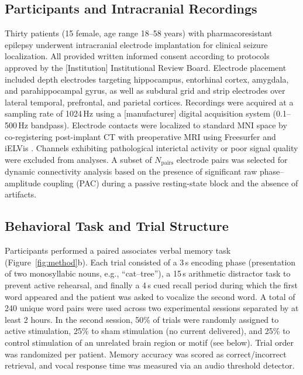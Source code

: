 \documentclass{article}
\begin{document}
\subsection{Participants and Intracranial Recordings}
Thirty patients (15 female, age range 18--58 years) with pharmacoresistant epilepsy underwent intracranial electrode implantation for clinical seizure localization. All provided written informed consent according to protocols approved by the [Institution] Institutional Review Board. Electrode placement included depth electrodes targeting hippocampus, entorhinal cortex, amygdala, and parahippocampal gyrus, as well as subdural grid and strip electrodes over lateral temporal, prefrontal, and parietal cortices. Recordings were acquired at a sampling rate of 1024\,Hz using a [manufacturer] digital acquisition system (0.1--500\,Hz bandpass). Electrode contacts were localized to standard MNI space by co-registering post-implant CT with preoperative MRI using Freesurfer and iELVis \cite{groppe2017ielvis}. Channels exhibiting pathological interictal activity or poor signal quality were excluded from analyses. A subset of \(N_{\text{pairs}}\) electrode pairs was selected for dynamic connectivity analysis based on the presence of significant raw phase–amplitude coupling (PAC) during a passive resting-state block and the absence of artifacts.

\subsection{Behavioral Task and Trial Structure}
Participants performed a paired associates verbal memory task (Figure~\ref{fig:method}b). Each trial consisted of a 3\,s encoding phase (presentation of two monosyllabic nouns, e.g., ``cat–tree''), a 15\,s arithmetic distractor task to prevent active rehearsal, and finally a 4\,s cued recall period during which the first word appeared and the patient was asked to vocalize the second word. A total of 240 unique word pairs were used across two experimental sessions separated by at least 2 hours. In the second session, 50\% of trials were randomly assigned to active stimulation, 25\% to sham stimulation (no current delivered), and 25\% to control stimulation of an unrelated brain region or motif (see below). Trial order was randomized per patient. Memory accuracy was scored as correct/incorrect retrieval, and vocal response time was measured via an audio threshold detector.
\end{document}

